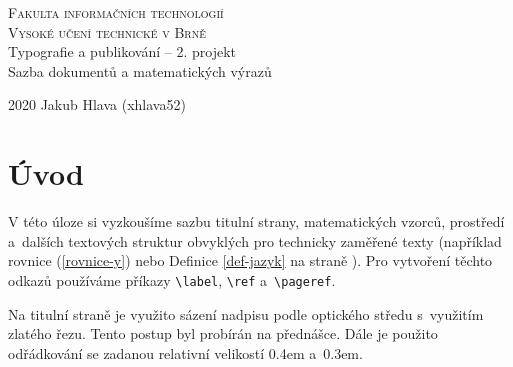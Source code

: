 \documentclass[twocolumn, 11pt, a4paper]{article}
\theoremstyle{definition}
\theoremstyle{plain}
\begin{document}
\begin{titlepage}
\begin{center}
    \Huge
    \textsc{Fakulta informačních technologií}\\
    \textsc{Vysoké učení technické v Brně}\\
    \LARGE
    Typografie a publikování -- 2. projekt\\
    Sazba dokumentů a matematických výrazů
\end{center}
{\Large 2020 \hfill Jakub Hlava (xhlava52)}
\end{titlepage}
\newpage

\section*{Úvod}
V této úloze si vyzkoušíme sazbu titulní strany, matematických vzorců, prostředí a~dalších textových struktur obvyklých pro technicky zaměřené texty (například rovnice (\ref{rovnice-y}) nebo Definice \ref{def-jazyk} na straně \pageref{def-jazyk}). Pro vytvoření těchto odkazů používáme příkazy \verb|\label|, \verb|\ref| a~\verb|\pageref|.
\par
Na titulní straně je využito sázení nadpisu podle optického středu s~využitím zlatého řezu. Tento postup byl
probírán na přednášce. Dále je použito odřádkování se zadanou relativní velikostí 0.4em a~0.3em.
\end{document}
